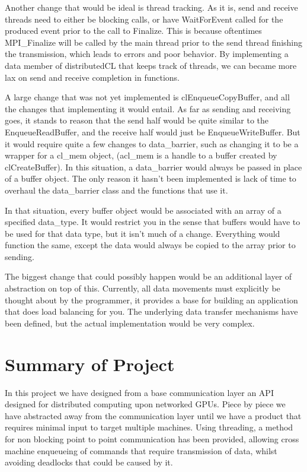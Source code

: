 \documentclass[../thesis.tex]{subfiles}
\begin{document}
Another change that would be ideal is thread tracking. As it is, send and receive threads need to either be blocking calls, or have WaitForEvent called for the produced event prior to the call to Finalize. This is because oftentimes MPI\_Finalize will be called by the main thread prior to the send thread finishing the transmission, which leads to errors and poor behavior. By implementing a data member of distributedCL that keeps track of threads, we can became more lax on send and receive completion in functions.

A large change that was not yet implemented is clEnqueueCopyBuffer, and all the changes that implementing it would entail. As far as sending and receiving goes, it stands to reason that the send half would be quite similar to the EnqueueReadBuffer, and the receive half would just be EnqueueWriteBuffer. But it would require quite a few changes to data\_barrier, such as changing it to be a wrapper for a cl\_mem object, (acl\_mem is a handle to a buffer created by clCreateBuffer). In this situation, a data\_barrier would always be passed in place of a buffer object. The only reason it hasn't been implemented is lack of time to overhaul the data\_barrier class and the functions that use it.

In that situation, every buffer object would be associated with an array of a specified data\_type. It would restrict you in the sense that buffers would have to be used for that data type, but it isn't much of a change. Everything would function the same, except the data would always be copied to the array prior to sending.

The biggest change that could possibly happen would be an additional layer of abstraction on top of this. Currently, all data movements must explicitly be thought about by the programmer, it provides a base for building an application that does load balancing for you. The underlying data transfer mechanisms have been defined, but the actual implementation would be very complex.


\section{Summary of Project}
In this project we have designed from a base communication layer an API designed for distributed computing upon networked GPUs. Piece by piece we have abstracted away from the communication layer until we have a product that requires minimal input to target multiple machines. Using threading, a method for non blocking point to point communication has been provided, allowing cross machine enqueueing of commands that require transmission of data, whilst avoiding deadlocks that could be caused by it.
\end{document}
